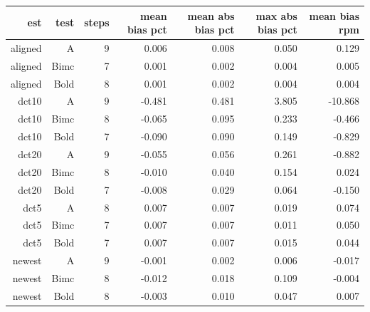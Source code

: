\begin{tabular}{@{}rrrrrrr@{}}
\toprule
est & test & steps & mean bias pct & mean abs bias pct & max abs bias pct & mean bias rpm \\
\midrule
aligned & A & 9 & 0.006 & 0.008 & 0.050 & 0.129 \\
aligned & Bimc & 7 & 0.001 & 0.002 & 0.004 & 0.005 \\
aligned & Bold & 8 & 0.001 & 0.002 & 0.004 & 0.004 \\
dct10 & A & 9 & -0.481 & 0.481 & 3.805 & -10.868 \\
dct10 & Bimc & 8 & -0.065 & 0.095 & 0.233 & -0.466 \\
dct10 & Bold & 7 & -0.090 & 0.090 & 0.149 & -0.829 \\
dct20 & A & 9 & -0.055 & 0.056 & 0.261 & -0.882 \\
dct20 & Bimc & 8 & -0.010 & 0.040 & 0.154 & 0.024 \\
dct20 & Bold & 7 & -0.008 & 0.029 & 0.064 & -0.150 \\
dct5 & A & 8 & 0.007 & 0.007 & 0.019 & 0.074 \\
dct5 & Bimc & 7 & 0.007 & 0.007 & 0.011 & 0.050 \\
dct5 & Bold & 7 & 0.007 & 0.007 & 0.015 & 0.044 \\
newest & A & 9 & -0.001 & 0.002 & 0.006 & -0.017 \\
newest & Bimc & 8 & -0.012 & 0.018 & 0.109 & -0.004 \\
newest & Bold & 8 & -0.003 & 0.010 & 0.047 & 0.007 \\
\bottomrule
\end{tabular}
